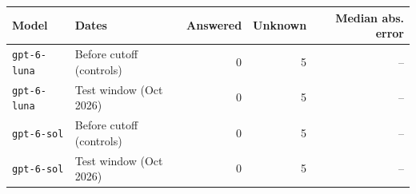 \begin{tabular}{llrrr}
\toprule
Model & Dates & Answered & Unknown & Median abs. error \\
\midrule
\texttt{gpt-6-luna} & Before cutoff (controls) & 0 & 5 & -- \\
\texttt{gpt-6-luna} & Test window (Oct 2026) & 0 & 5 & -- \\
\texttt{gpt-6-sol} & Before cutoff (controls) & 0 & 5 & -- \\
\texttt{gpt-6-sol} & Test window (Oct 2026) & 0 & 5 & -- \\
\bottomrule
\end{tabular}
